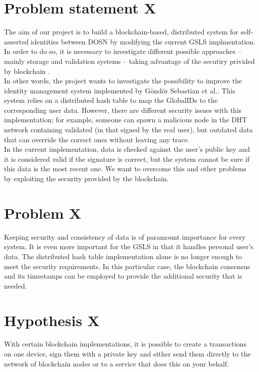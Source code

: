 \documentclass[paper=a4, fontsize=11pt]{scrartcl} %
\numberwithin{equation}{section} %
\numberwithin{figure}{section} %
\numberwithin{table}{section} %
\begin{document}
\section{Problem statement X}
The aim of our project is to build a blockchain-based, distributed system for self-asserted identities between DOSN \cite{blockchain-id-mgmt2017} by modifying the current GSLS implmentation. In order to do so, it is necessary to investigate different possible approaches -- mainly storage and validation systems -- taking advantage of the secutiry privided by blockchain \cite{nakamoto2008bitcoin}. 
\\

In other words, the project wants to investigate the possibility to improve the identity management system implemented by G{\"o}nd{\"o}r Sebastian et al.. This system relies on a distributed hash table to map the GlobalIDs to the corresponding user data. However, there are different security issues with this implementation; for example, someone can spawn a malicious node in the DHT network containing validated (in that signed by the real user), but outdated data that can override the correct ones without leaving any trace. 
\\

In the current implementation, data is checked against the user’s public key and it is considered valid if the signature is correct, but the system cannot be sure if this data is the most recent one. We want to overcome this and other problems by exploiting the security provided by the blockchain. 

\section{Problem X}
Keeping security and consistency of data is of paramount importance for every system. It is even more important for the GSLS in that it handles personal user's data.  The distributed hash table implementation alone is no longer enough to meet the security requirements. In this particular case, the blockchain consensus and its timestamps can be employed to provide the additional security that is needed. 

\section{Hypothesis X}
With certain blockchain implementations, it is possible to create a transactions \cite{wood2014ethereum} on one device, sign them with a private key and either send them directly to the network of blockchain nodes or to a service that does this on your behalf. \\
\end{document}
